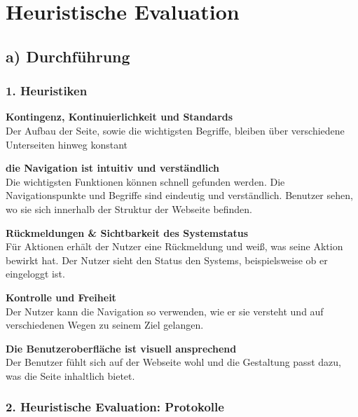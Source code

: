 \documentclass[parskip,10pt,abstracton]{scrartcl}
\begin{document}
\section{Heuristische Evaluation}

\subsection*{a) Durchführung}

\subsubsection*{1. Heuristiken}

\textbf{Kontingenz, Kontinuierlichkeit und Standards}\\
Der Aufbau der Seite, sowie die wichtigsten Begriffe, bleiben über verschiedene Unterseiten hinweg konstant

\textbf{die Navigation ist intuitiv und verständlich}\\
Die wichtigsten Funktionen können schnell gefunden werden. Die Navigationspunkte und Begriffe sind eindeutig und verständlich. Benutzer sehen, wo sie sich innerhalb der Struktur der Webseite befinden.

\textbf{Rückmeldungen \& Sichtbarkeit des Systemstatus}\\
Für Aktionen erhält der Nutzer eine Rückmeldung und weiß, was seine Aktion bewirkt hat. Der Nutzer sieht den Status den Systems, beispielsweise ob er eingeloggt ist.

\textbf{Kontrolle und Freiheit}\\
Der Nutzer kann die Navigation so verwenden, wie er sie versteht und auf verschiedenen Wegen zu seinem Ziel gelangen.

\textbf{Die Benutzeroberfläche ist visuell ansprechend}\\
Der Benutzer fühlt sich auf der Webseite wohl und die Gestaltung passt dazu, was die Seite inhaltlich bietet.

\subsubsection*{2. Heuristische Evaluation: Protokolle}
\end{document}
